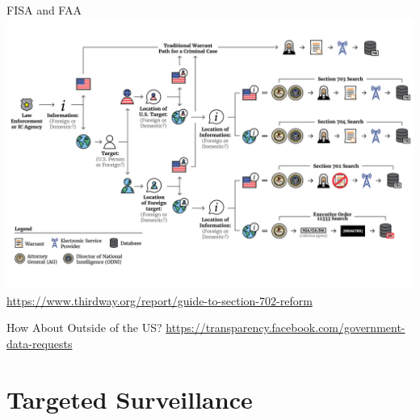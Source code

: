 \documentclass[nobackground,dvipsnames,table]{beamer}
\begin{document}
\begin{frame}{FISA and FAA}
    \includegraphics[width=\textwidth]{section-702-flowchart}
    \tiny
    \url{https://www.thirdway.org/report/guide-to-section-702-reform}
\end{frame}

\begin{frame}{How About Outside of the US?}
    \tiny
    \url{https://transparency.facebook.com/government-data-requests}
\end{frame}

\section{Targeted Surveillance}
\end{document}
